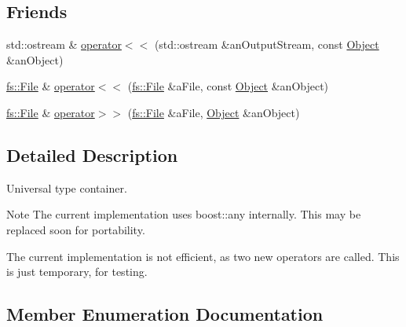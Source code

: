 \subsection*{Friends}
\begin{DoxyCompactItemize}
\item 
std\+::ostream \& \mbox{\hyperlink{classlibrary_1_1core_1_1ctnr_1_1_object_a418df9bf4a73078f3d494edef1743f8d}{operator$<$$<$}} (std\+::ostream \&an\+Output\+Stream, const \mbox{\hyperlink{classlibrary_1_1core_1_1ctnr_1_1_object}{Object}} \&an\+Object)
\item 
\mbox{\hyperlink{classlibrary_1_1core_1_1fs_1_1_file}{fs\+::\+File}} \& \mbox{\hyperlink{classlibrary_1_1core_1_1ctnr_1_1_object_af9350d4362cb9ad3424f4a6bb6d77a4c}{operator$<$$<$}} (\mbox{\hyperlink{classlibrary_1_1core_1_1fs_1_1_file}{fs\+::\+File}} \&a\+File, const \mbox{\hyperlink{classlibrary_1_1core_1_1ctnr_1_1_object}{Object}} \&an\+Object)
\item 
\mbox{\hyperlink{classlibrary_1_1core_1_1fs_1_1_file}{fs\+::\+File}} \& \mbox{\hyperlink{classlibrary_1_1core_1_1ctnr_1_1_object_ad91e1957f0afd5d49dde0b81d11a66e1}{operator$>$$>$}} (\mbox{\hyperlink{classlibrary_1_1core_1_1fs_1_1_file}{fs\+::\+File}} \&a\+File, \mbox{\hyperlink{classlibrary_1_1core_1_1ctnr_1_1_object}{Object}} \&an\+Object)
\end{DoxyCompactItemize}


\subsection{Detailed Description}
Universal type container. 

\begin{DoxyNote}{Note}
The current implementation uses boost\+::any internally. This may be replaced soon for portability. 

The current implementation is not efficient, as two new operators are called. This is just temporary, for testing. 
\end{DoxyNote}


\subsection{Member Enumeration Documentation}
\mbox{\label{classlibrary_1_1core_1_1ctnr_1_1_object_a7bf8961c4ef65f691aa2993ec405c647}} 
